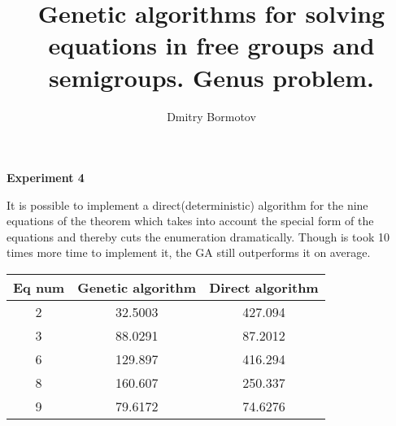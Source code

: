 \documentclass[12pt]{slides}
\title{Genetic algorithms for solving
equations in free groups and semigroups.  Genus problem.}
\author{Dmitry Bormotov} \date{}
\begin{document}
\pagestyle{empty}

\vspace{5mm}
\begin{center} \Large\textbf{Experiment 4} \end{center}
\vspace{12mm}

It is possible to implement a direct(deterministic) algorithm for the
nine equations of the theorem which takes into account the special
form of the equations and thereby cuts the enumeration
dramatically. Though is took 10 times more time to implement it, the
GA still outperforms it on average.

\vspace{8mm}
\begin{tabular}{|c|c|c|} \hline
Eq num & Genetic algorithm & Direct algorithm \\ \hline
2 & 32.5003 & 427.094 \\ \hline
3 & 88.0291 & 87.2012 \\ \hline
6 & 129.897 & 416.294 \\ \hline
8 & 160.607 & 250.337 \\ \hline
9 & 79.6172 & 74.6276 \\ \hline
\end{tabular}
\vspace{3mm}
\end{document}
